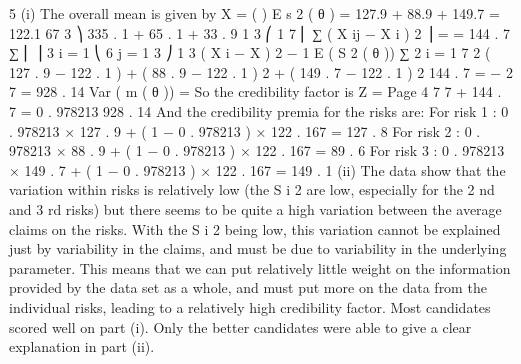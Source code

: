 \documentclass[a4paper,12pt]{article}
\begin{document}
5
(i)
The overall mean is given by X =
(
)
E s 2 ( θ ) =
127.9 + 88.9 + 149.7
= 122.1 67
3
⎞ 335 . 1 + 65 . 1 + 33 . 9
1 3 ⎛ 1 7
⎜ ∑ ( X ij − X i ) 2 ⎟ =
= 144 . 7
∑
⎜
⎟
3 i = 1 ⎝ 6 j = 1
3
⎠
1 3
( X i − X ) 2 − 1 E ( S 2 ( θ ))
∑
2 i = 1
7
2
( 127 . 9 − 122 . 1 ) + ( 88 . 9 − 122 . 1 ) 2 + ( 149 . 7 − 122 . 1 ) 2 144 . 7
=
−
2
7
= 928 . 14
Var ( m ( θ )) =
So the credibility factor is Z =
Page 4
7
7 + 144 . 7
= 0 . 978213
928 . 14
And the credibility premia for the risks are:
For risk 1 : 0 . 978213 × 127 . 9 + ( 1 − 0 . 978213 ) × 122 . 167 = 127 . 8
For risk 2 : 0 . 978213 × 88 . 9 + ( 1 − 0 . 978213 ) × 122 . 167 = 89 . 6
For risk 3 : 0 . 978213 × 149 . 7 + ( 1 − 0 . 978213 ) × 122 . 167 = 149 . 1
(ii)
The data show that the variation within risks is relatively low (the S i 2 are low, especially for the 2 nd and 3 rd risks) but there seems to be quite a high variation between the average claims on the risks.
With the S i 2 being low, this variation cannot be explained just by variability in the claims, and must be due to variability in the underlying parameter.
This means that we can put relatively little weight on the information provided by the data set as a whole, and must put more on the data from the individual risks, leading to a relatively high credibility factor.
Most candidates scored well on part (i). Only the better candidates were able to give a clear explanation in part (ii).
\end{document}
